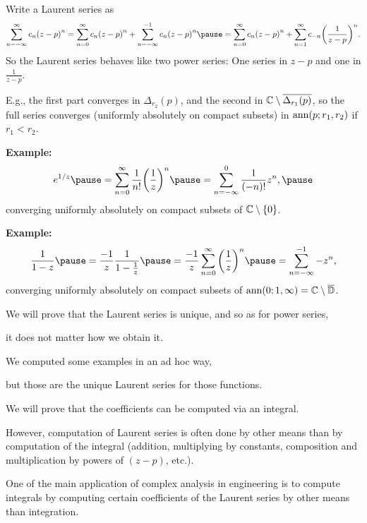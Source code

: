 \documentclass[10pt,aspectratio=169]{beamer}
\begin{document}
\begin{frame}
Write a Laurent series as 
\[
\sum_{n=-\infty}^{\infty} c_n {(z-p)}^n
=
\sum_{n=0}^{\infty} c_n {(z-p)}^n
+
\sum_{n=-\infty}^{-1} c_n {(z-p)}^n
\pause
=
\sum_{n=0}^{\infty} c_n {(z-p)}^n
+
\sum_{n=1}^{\infty} c_{-n} {\left(\frac{1}{z-p}\right)}^n .
\]
\pause
So the Laurent series behaves like two power series:
\pause
One series in $z-p$ and one in $\frac{1}{z-p}$.

\medskip
\pause

E.g., the first part converges in $\Delta_{r_2}(p)$, and the second
in ${\mathbb{C}} \setminus \overline{\Delta_{r_1}(p)}$, so the full series converges
(uniformly absolutely on compact subsets) in $\operatorname{ann}(p;r_1,r_2)$ if $r_1 < r_2$.

\medskip
\pause

\textbf{Example:}
\[
e^{1/z}
\pause
=
\sum_{n=0}^{\infty} \frac{1}{n!} {\left(\frac{1}{z}\right)}^n
\pause
=
\sum_{n=-\infty}^0 \frac{1}{(-n)!} z^n ,
\pause
\]
converging uniformly absolutely on compact subsets of ${\mathbb{C}} \setminus \{ 0 \}$.

\medskip
\pause

\textbf{Example:}
\[
\frac{1}{1-z}
\pause
=
\frac{-1}{z}
\frac{1}{1-\frac{1}{z}}
\pause
=
\frac{-1}{z}
\sum_{n=0}^\infty
{\left(\frac{1}{z}\right)}^n
\pause
=
\sum_{n=-\infty}^{-1}
- z^{n} ,
\]
converging uniformly absolutely on compact subsets of  $\operatorname{ann}(0;1,\infty) = {\mathbb{C}} \setminus \overline{{\mathbb{D}}}$.
\end{frame}

\begin{frame}
We will prove that the Laurent series is unique, and so
as for power series,

it does not matter how we obtain it.

\medskip
\pause

We computed some examples in an ad hoc way,

but those are the unique Laurent series for those functions.

\medskip
\pause

We will prove that the coefficients can be computed via
an integral.

\medskip
\pause

However, computation of Laurent series is often done by other means
than by computation of the integral (addition, multiplying
by constants, composition and multiplication by powers of $(z-p)$, etc.).

\medskip
\pause

One of the main application of complex analysis in engineering
is to compute integrals by computing certain coefficients
of the Laurent series by other means than integration.
\end{frame}
\end{document}
